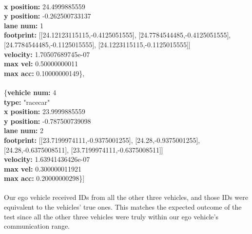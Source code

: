 \begin{enumerate}
\begin{itemize}
    \\\hspace*{10mm} \textbf{x position:} 24.4999885559
    \\\hspace*{10mm} \textbf{y position:} -0.262500733137
    \\\hspace*{10mm} \textbf{lane num:} 1
    \\\hspace*{10mm} \textbf{footprint:} [[24.12123115115,-0.4125051555], [24.7784544485,-0.4125051555], [24.7784544485,-0.1125015555], [24.1223115115,-0.1125015555]]
    \\\hspace*{10mm} \textbf{velocity:} 1.70507689745e-07
    \\\hspace*{10mm} \textbf{max vel:} 0.50000000011
    \\\hspace*{10mm} \textbf{max acc:} 0.10000000149\},
    \\
    \\\hspace*{7.5mm} \{\textbf{vehicle num:} 4
    \\\hspace*{10mm} \textbf{type:} "racecar"
    \\\hspace*{10mm} \textbf{x position:} 23.9999885559
    \\\hspace*{10mm} \textbf{y position:} -0.787500739098
    \\\hspace*{10mm} \textbf{lane num:} 2
    \\\hspace*{10mm} \textbf{footprint:} [[23.7199974111,-0.9375001255], [24.28,-0.9375001255], [24.28,-0.6375008511], [23.7199974111,-0.6375008511]]
    \\\hspace*{10mm} \textbf{velocity:} 1.63941436426e-07
    \\\hspace*{10mm} \textbf{max vel:} 0.300000011921
    \\\hspace*{10mm} \textbf{max acc:} 0.20000000298\}] \\ \\
            Our ego vehicle received IDs from all the other three vehicles, and those IDs were equivalent to the vehicles’ true ones. This matches the expected outcome of the test since all the other three vehicles were truly within our ego vehicle’s communication range.

\end{itemize}
\end{enumerate}
